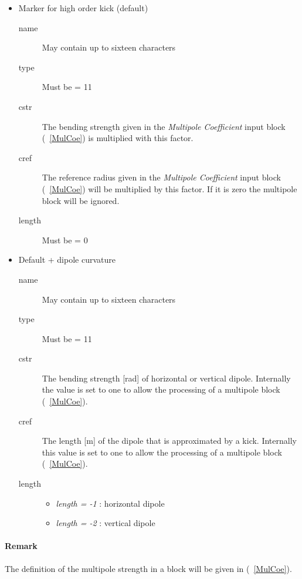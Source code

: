 \documentclass[a4paper,11pt]{report}
\begin{document}
\begin{itemize}
\item Marker for high order kick (default)
\begin{description}
\item [name] May contain up to sixteen characters
\item [type] Must be = 11
\item [cstr] The bending strength given in the {\em Multipole
    Coefficient} \/input block (~\ref{MulCoe}) is multiplied with this
  factor.
\item [cref] The reference radius given in the {\em Multipole
    Coefficient} \/input block (~\ref{MulCoe}) will be multiplied by
  this factor.  If it is zero the multipole block will be ignored.
\item [length] Must be = 0
\end{description}

\item Default + dipole curvature
\begin{description}
\item [name] May contain up to sixteen characters
\item [type] Must be = 11
\item [cstr] The bending strength [rad] of horizontal or vertical
  dipole.  \newline Internally the value is set to one to allow the
  processing of a multipole block (~\ref{MulCoe}).
\item [cref] The length [m] of the dipole that is approximated by a
  kick.  Internally this value is set to one to allow the processing
  of a multipole block (~\ref{MulCoe}).
\item [length] \hspace{-2mm}

  \begin{itemize}
  \item {\em length = -1} \/: horizontal dipole
  \item {\em length = -2} \/: vertical dipole
  \end{itemize}
\end{description}
\end{itemize}

\paragraph{Remark}
The definition of the multipole strength in a block will be given in
(~\ref{MulCoe}).
\end{document}
